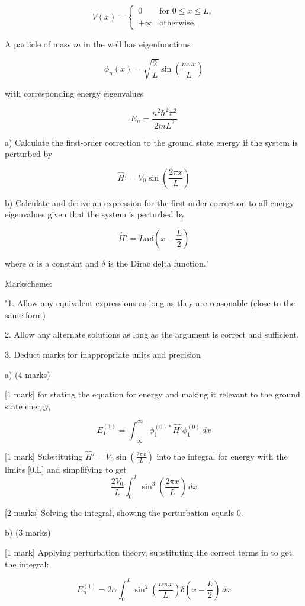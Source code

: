 \[ V(x) = \begin{cases}
0 & \text{for } 0 \leq x \leq L,\\
+\infty  & \text{otherwise,} 
\end{cases} \]

A particle of mass \( m \) in the well has eigenfunctions

\[ \phi_{n}(x) = \sqrt{\frac{2}{L}} \sin\left(\frac{n \pi x}{L} \right) \]

with corresponding energy eigenvalues 

\[ E_{n} = \frac{n^{2}\hbar^{2}\pi^{2}}{2mL^{2}} \]

a) Calculate the first-order correction to the ground state energy if the system is perturbed by 

\[ \hat{H}' = V_{0} \sin\left(\frac{2 \pi x}{L} \right) \]

b) Calculate and derive an expression for the first-order correction to all energy eigenvalues given that the system is perturbed by 

\[ \hat{H}' = L\alpha \delta\left(x - \frac{L}{2} \right) \]

where \( \alpha \) is a constant and \( \delta \) is the Dirac delta function."

Markscheme:

"1. Allow any equivalent expressions as long as they are reasonable (close to the same form)

2. Allow any alternate solutions as long as the argument is correct and sufficient. 

3. Deduct marks for inappropriate units and precision

a) (4 marks)

[1 mark] for stating the equation for energy and making it relevant to the ground state energy, 

\[ E_{1}^{(1)} = \int_{-\infty}^{\infty} \phi_{1}^{(0)*}\hat{H'}\phi_{1}^{(0)} \, dx \]

[1 mark] Substituting \( \hat{H}' = V_{0} \sin\left(\frac{2 \pi x}{L} \right) \) into the integral for energy with the limits [0,L] and simplifying to get \[ \frac{2V_{0}}{L} \int_{0}^{L} \sin^{3}\left(\frac{2 \pi x}{L} \right) \, dx \]

[2 marks] Solving the integral, showing the perturbation equals 0.

b) (3 marks)

[1 mark] Applying perturbation theory, substituting the correct terms in to get the integral: 

\[ E_{n}^{(1)} = 2 \alpha \int_{0}^{L} \sin^{2}\left(\frac{n \pi x}{L} \right) \delta\left(x - \frac{L}{2} \right) \, dx \]

